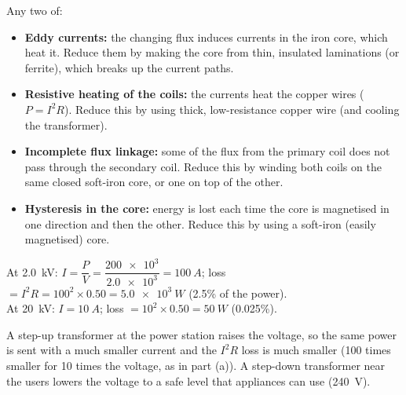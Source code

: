 \documentclass[12pt]{article}
\begin{document}
\ansq
\begin{crit}
\end{crit}
\sample
Any two of:
\begin{itemize}
  \item \textbf{Eddy currents:} the changing flux induces currents in the iron core, which heat it.
        Reduce them by making the core from thin, insulated laminations (or ferrite), which breaks up the
        current paths.
  \item \textbf{Resistive heating of the coils:} the currents heat the copper wires ($P = I^2R$).
        Reduce this by using thick, low-resistance copper wire (and cooling the transformer).
  \item \textbf{Incomplete flux linkage:} some of the flux from the primary coil does not pass through
        the secondary coil. Reduce this by winding both coils on the same closed soft-iron core, or one on
        top of the other.
  \item \textbf{Hysteresis in the core:} energy is lost each time the core is magnetised in one direction
        and then the other. Reduce this by using a soft-iron (easily magnetised) core.
\end{itemize}

\ansq
{}
\begin{crit}
\end{crit}
\sample
At \qty{2.0}{kV}: $I = \dfrac{P}{V} = \dfrac{\num{200e3}}{\num{2.0e3}} = \qty{100}{A}$;
loss $= I^2R = 100^2 \times 0.50 = \qty{5.0e3}{W}$ (2.5\% of the power).\\
At \qty{20}{kV}: $I = \qty{10}{A}$; loss $= 10^2 \times 0.50 = \qty{50}{W}$ (0.025\%).
\begin{crit}
\end{crit}
\sample
A step-up transformer at the power station raises the voltage, so the same power is sent with a much
smaller current and the $I^2R$ loss is much smaller (100 times smaller for 10 times the voltage, as in
part (a)). A step-down transformer near the users lowers the voltage to a safe level that appliances
can use (\qty{240}{V}).
\end{document}
